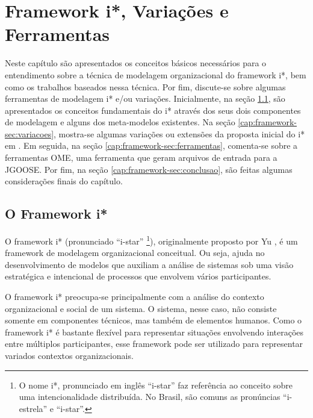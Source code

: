 \chapter{Framework i*, Variações e Ferramentas}
    \label{cap:framework}
        Neste capítulo são apresentados os conceitos básicos necessários para o entendimento sobre a técnica de modelagem organizacional do framework i*, bem como os trabalhos baseados nessa técnica.
        Por fim, discute-se sobre algumas ferramentas de modelagem i* e/ou variações.
            Inicialmente, na seção \ref{cap:framework-sec:istar}, são apresentados os conceitos fundamentais do i* através dos seus dois componentes de modelagem e alguns dos meta-modelos existentes.
            Na seção \ref{cap:framework-sec:variacoes}, mostra-se algumas variações ou extensões da proposta inicial do i* em \cite{yu1995modelling}.
            Em seguida, na seção \ref{cap:framework-sec:ferramentas}, comenta-se sobre a ferramentas OME, uma ferramenta que geram arquivos de entrada para a JGOOSE.
            Por fim, na seção \ref{cap:framework-sec:conclusao}, são feitas algumas considerações finais do capítulo.
    \section{O Framework i*}
        \label{cap:framework-sec:istar}
                O framework i* (pronunciado ``i-star''
                        \footnote{O nome i*, pronunciado em inglês ``i-star'' faz referência ao conceito sobre uma intencionalidade distribuída. No Brasil, são comuns as pronúncias ``i-estrela'' e ``i-star''.}),
                    originalmente proposto por Yu \cite{yu1995modelling},
                é um framework de modelagem organizacional conceitual.
                Ou seja, ajuda no desenvolvimento de modelos que auxiliam a análise de sistemas sob uma visão estratégica e intencional de processos que envolvem vários participantes.

                O framework i* preocupa-se principalmente com a análise do contexto organizacional e social de um sistema.
                O sistema, nesse caso, não consiste somente em componentes técnicos, mas também de elementos humanos.
                Como o framework i* é bastante flexível para representar situações envolvendo interações entre múltiplos participantes,
                esse framework pode ser utilizado para representar variados contextos organizacionais.

